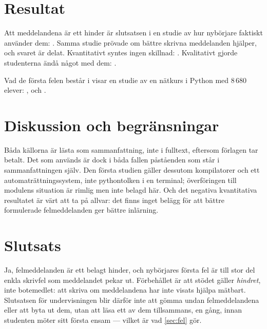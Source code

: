 \section{Resultat}
\label{sec:fel-resultat}

Att meddelandena är ett hinder är slutsatsen i en studie av hur nybörjare
faktiskt använder dem: .  Samma studie prövade om bättre skrivna meddelanden
hjälper, och svaret är delat.  Kvantitativt syntes ingen skillnad:
.  Kvalitativt
gjorde studenterna ändå något med dem:
.

Vad de första felen består i visar en studie av en nätkurs i Python med
8\,680 elever: ,
och .

\section{Diskussion och begränsningar}
\label{sec:fel-diskussion}

Båda källorna är lästa som sammanfattning, inte i fulltext, eftersom
förlagen tar betalt.  Det som används är dock i båda fallen påståenden som
står i sammanfattningen själv.  Den första studien gäller dessutom
kompilatorer och ett automaträttningssystem, inte pythontolken i en
terminal; överföringen till modulens situation är rimlig men inte belagd
här.  Och det negativa kvantitativa resultatet är värt att ta på allvar:
det finns inget belägg för att bättre formulerade felmeddelanden ger
bättre inlärning.

\section{Slutsats}
\label{sec:fel-slutsats}

Ja, felmeddelanden är ett belagt hinder, och nybörjares första fel är
till stor del enkla skrivfel som meddelandet pekar ut.  Förbehållet är
att stödet gäller \emph{hindret}, inte botemedlet: att skriva om
meddelandena har inte visats hjälpa mätbart.  Slutsatsen för
undervisningen blir därför inte att gömma undan felmeddelandena eller att
byta ut dem, utan att läsa ett av dem tillsammans, en gång, innan
studenten möter sitt första ensam --- vilket är vad \cref{sec:fel} gör.

